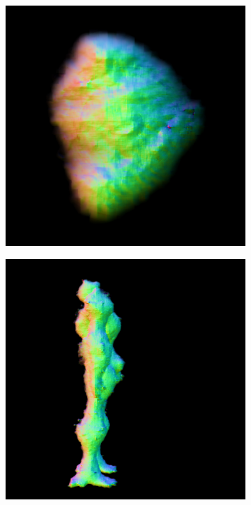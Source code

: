 \begin{figure}[ht]
    \centering
    \begin{subfigure}[b]{0.222\textwidth}
        \centering
        \fontsize{9pt}{7pt}\selectfont{}\vspace{.1cm}
        \includegraphics[width=\textwidth]{etc/a robot made out of plants/magic123/magic123_coarse_robot_right_0_part2.png}
        \caption{}
    \end{subfigure}
    \begin{subfigure}[b]{0.222\textwidth}
        \centering
        \fontsize{9pt}{7pt}\selectfont{}\vspace{.1cm}
        \includegraphics[width=\textwidth]{etc/a robot made out of plants/magic123/magic123_coarse_robot_right_5000_part2.png}

\end{subfigure}
\end{figure}
